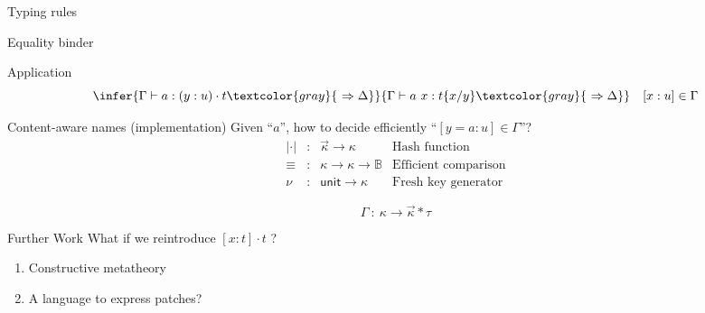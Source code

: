\documentclass[ignorenonframetext,red]{beamer}
\begin{document}
\begin{frame}{Typing rules}
  \begin{block}{Equality binder}
  \end{block}
  \pause
  \begin{block}{Application}
    \[ \infer
      {\Gamma\vdash a : (y:u)\cdot t \textcolor{gray}{\ \Rightarrow\Delta}}
      {\Gamma\vdash a\ x : t \{x/y\} \textcolor{gray}{\ \Rightarrow\Delta}}
      \quad [x : u] \in \Gamma
      \]
  \end{block}
\end{frame}

\begin{frame}{Content-aware names (implementation)}
  Given ``$a$'', how to decide efficiently ``$[y = a : u] \in
  \Gamma$''?
  \pause
  \[ \begin{array}{lllr}
    | \cdot | &:& \vec\kappa \rightarrow \kappa & \text{Hash function}\\
    \equiv    &:& \kappa \rightarrow \kappa \rightarrow \mathbb{B} & \text{Efficient comparison}\\
    \nu       &:& \textsf{unit} \rightarrow \kappa & \text{Fresh key generator}
  \end{array} \]
  \pause
  \pause
  \Large
  \[ \Gamma\ :\ \kappa \to \vec\kappa * \tau \]
\end{frame}

\begin{frame}{Further Work}
  \Large
What if we reintroduce {\Huge $[x:t]\cdot t$} ?
\begin{enumerate} \normalsize
\pause
\item Constructive metatheory
\pause
\item A language to express patches?
\end{enumerate}
\end{frame}
\end{document}
